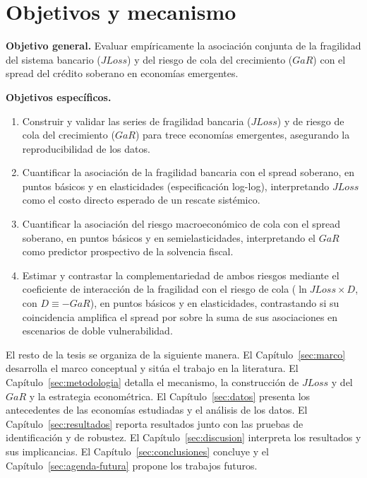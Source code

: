 \section{Objetivos y mecanismo}
\label{sec:objetivos}
\label{sec:mecanismo-conceptual}

\textbf{Objetivo general.} Evaluar empíricamente la asociación conjunta de la fragilidad del sistema
bancario ($JLoss$) y del riesgo de cola del crecimiento ($GaR$) con el spread del crédito soberano en
economías emergentes.

\textbf{Objetivos específicos.}
\begin{enumerate}
    \item Construir y validar las series de fragilidad bancaria ($JLoss$) y de riesgo de cola del
    crecimiento ($GaR$) para trece economías emergentes, asegurando la reproducibilidad de los datos.
    \item Cuantificar la asociación de la fragilidad bancaria con el spread soberano, en puntos
    básicos y en elasticidades (especificación log-log), interpretando $JLoss$ como el costo directo
    esperado de un rescate sistémico.
    \item Cuantificar la asociación del riesgo macroeconómico de cola con el spread soberano, en
    puntos básicos y en semielasticidades, interpretando el $GaR$ como predictor prospectivo de la
    solvencia fiscal.
    \item Estimar y contrastar la complementariedad de ambos riesgos mediante el coeficiente de
    interacción de la fragilidad con el riesgo de cola ($\ln JLoss\times D$, con $D\equiv-GaR$), en
    puntos básicos y en elasticidades, contrastando si su coincidencia amplifica el spread por sobre la
    suma de sus asociaciones en escenarios de doble vulnerabilidad.
\end{enumerate}

El resto de la tesis se organiza de la siguiente manera. El Capítulo~\ref{sec:marco} desarrolla el
marco conceptual y sitúa el trabajo en la literatura. El Capítulo~\ref{sec:metodologia} detalla el
mecanismo, la construcción de $JLoss$ y del $GaR$ y la estrategia econométrica. El
Capítulo~\ref{sec:datos} presenta los antecedentes de las economías estudiadas y el análisis de los
datos. El Capítulo~\ref{sec:resultados} reporta resultados junto con las pruebas de identificación y de
robustez. El Capítulo~\ref{sec:discusion} interpreta los resultados y sus implicancias. El
Capítulo~\ref{sec:conclusiones} concluye y el Capítulo~\ref{sec:agenda-futura} propone los trabajos
futuros.
